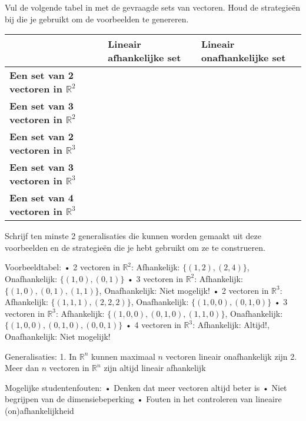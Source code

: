 \documentclass{ximera}
\begin{document}
\begin{problem}
Vul de volgende tabel in met de gevraagde sets van vectoren. Houd de strategieën bij die je gebruikt om de voorbeelden te genereren.

\begin{center}
\begin{tabular}{|p{4cm}|p{4cm}|p{4cm}|}
\hline
& \textbf{Lineair afhankelijke set} & \textbf{Lineair onafhankelijke set} \\
\hline
\textbf{Een set van 2 vectoren in $\mathbb{R}^2$} & & \\
\hline
\textbf{Een set van 3 vectoren in $\mathbb{R}^2$} & & \\
\hline
\textbf{Een set van 2 vectoren in $\mathbb{R}^3$} & & \\
\hline
\textbf{Een set van 3 vectoren in $\mathbb{R}^3$} & & \\
\hline
\textbf{Een set van 4 vectoren in $\mathbb{R}^3$} & & \\
\hline
\end{tabular}
\end{center}

Schrijf ten minste 2 generalisaties die kunnen worden gemaakt uit deze voorbeelden en de strategieën die je hebt gebruikt om ze te construeren.

\begin{freeResponse}
Voorbeeldtabel:
• 2 vectoren in $\mathbb{R}^2$: Afhankelijk: $\{(1,2), (2,4)\}$, Onafhankelijk: $\{(1,0), (0,1)\}$
• 3 vectoren in $\mathbb{R}^2$: Afhankelijk: $\{(1,0), (0,1), (1,1)\}$, Onafhankelijk: Niet mogelijk!
• 2 vectoren in $\mathbb{R}^3$: Afhankelijk: $\{(1,1,1), (2,2,2)\}$, Onafhankelijk: $\{(1,0,0), (0,1,0)\}$
• 3 vectoren in $\mathbb{R}^3$: Afhankelijk: $\{(1,0,0), (0,1,0), (1,1,0)\}$, Onafhankelijk: $\{(1,0,0), (0,1,0), (0,0,1)\}$
• 4 vectoren in $\mathbb{R}^3$: Afhankelijk: Altijd!, Onafhankelijk: Niet mogelijk!

Generalisaties:
1. In $\mathbb{R}^n$ kunnen maximaal $n$ vectoren lineair onafhankelijk zijn
2. Meer dan $n$ vectoren in $\mathbb{R}^n$ zijn altijd lineair afhankelijk

Mogelijke studentenfouten:
• Denken dat meer vectoren altijd beter is
• Niet begrijpen van de dimensiebeperking
• Fouten in het controleren van lineaire (on)afhankelijkheid
\end{freeResponse}
\end{problem}
\end{document}
